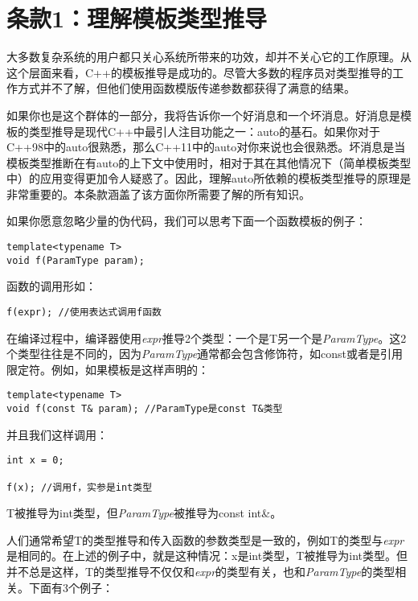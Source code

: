\section{条款1：理解模板类型推导}

大多数复杂系统的用户都只关心系统所带来的功效，却并不关心它的工作原理。从这个层面来看，C++的模板推导是成功的。尽管大多数的程序员对类型推导的工作方式并不了解，但他们使用函数模版传递参数都获得了满意的结果。

如果你也是这个群体的一部分，我将告诉你一个好消息和一个坏消息。好消息是模板的类型推导是现代C++中最引人注目功能之一：{\M auto}的基石。如果你对于C++98中的{\M auto}很熟悉，那么C++11中的{\M auto}对你来说也会很熟悉。坏消息是当模板类型推断在有{\M auto}的上下文中使用时，相对于其在其他情况下（简单模板类型中）的应用变得更加令人疑惑了。因此，理解{\M auto}所依赖的模板类型推导的原理是非常重要的。本条款涵盖了该方面你所需要了解的所有知识。

如果你愿意忽略少量的伪代码，我们可以思考下面一个函数模板的例子：

\begin{lstlisting}
template<typename T>
void f(ParamType param);
\end{lstlisting}

函数的调用形如：

\begin{lstlisting}
f(expr); //使用表达式调用f函数
\end{lstlisting}

在编译过程中，编译器使用\textit{expr}推导2个类型：一个是{\M T}另一个是\textit{ParamType}。这2个类型往往是不同的，因为\textit{ParamType}通常都会包含修饰符，如{\M const}或者是引用限定符。例如，如果模板是这样声明的：

\begin{lstlisting}
template<typename T>
void f(const T& param); //ParamType是const T&类型
\end{lstlisting}

并且我们这样调用：

\begin{lstlisting}
int x = 0;

f(x); //调用f，实参是int类型
\end{lstlisting}

{\M T}被推导为{\M int}类型，但\textit{ParamType}被推导为const int\&。

人们通常希望{\M T}的类型推导和传入函数的参数类型是一致的，例如{\M T}的类型与\textit{expr}是相同的。在上述的例子中，就是这种情况：{\M x}是{\M int}类型，{\M T}被推导为{\M int}类型。但并不总是这样，{\M T}的类型推导不仅仅和\textit{expr}的类型有关，也和\textit{ParamType}的类型相关。下面有3个例子：

